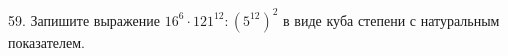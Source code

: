59. Запишите выражение $16^6\cdot121^{12}:(5^{12})^2$ в виде куба степени с натуральным показателем.\\

